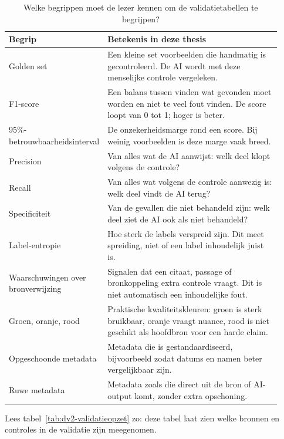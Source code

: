 \begin{table}[htbp]
\centering
\small
\caption{Welke begrippen moet de lezer kennen om de validatietabellen te begrijpen?}
\label{tab:dv2-begrippen}
\begin{tabular}{p{0.28\linewidth}p{0.64\linewidth}}
\hline
Begrip & Betekenis in deze thesis \\
\hline
Golden set & Een kleine set voorbeelden die handmatig is gecontroleerd. De AI wordt met deze menselijke controle vergeleken. \\
F1-score & Een balans tussen vinden wat gevonden moet worden en niet te veel fout vinden. De score loopt van 0 tot 1; hoger is beter. \\
95\%-betrouwbaarheidsinterval & De onzekerheidsmarge rond een score. Bij weinig voorbeelden is deze marge vaak breed. \\
Precision & Van alles wat de AI aanwijst: welk deel klopt volgens de controle? \\
Recall & Van alles wat volgens de controle aanwezig is: welk deel vindt de AI terug? \\
Specificiteit & Van de gevallen die niet behandeld zijn: welk deel ziet de AI ook als niet behandeld? \\
Label-entropie & Hoe sterk de labels verspreid zijn. Dit meet spreiding, niet of een label inhoudelijk juist is. \\
Waarschuwingen over bronverwijzing & Signalen dat een citaat, passage of bronkoppeling extra controle vraagt. Dit is niet automatisch een inhoudelijke fout. \\
Groen, oranje, rood & Praktische kwaliteitskleuren: groen is sterk bruikbaar, oranje vraagt nuance, rood is niet geschikt als hoofdbron voor een harde claim. \\
Opgeschoonde metadata & Metadata die is gestandaardiseerd, bijvoorbeeld zodat datums en namen beter vergelijkbaar zijn. \\
Ruwe metadata & Metadata zoals die direct uit de bron of AI-output komt, zonder extra opschoning. \\
\hline
\end{tabular}
\end{table}

Lees tabel~\ref{tab:dv2-validatieopzet} zo: deze tabel laat zien welke bronnen en controles in de validatie zijn meegenomen.

